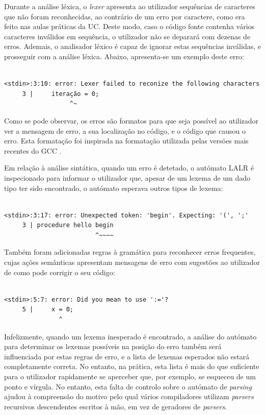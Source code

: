 \documentclass[12pt, a4paper]{article}
\begin{document}
Durante a análise léxica, o \emph{lexer} apresenta ao utilizador sequências de caracteres que não
foram reconhecidas, ao contrário de um erro por caractere, como era feito nas aulas práticas da UC.
Deste modo, caso o código fonte contenha vários caracteres inválidos em sequência, o utilizador não
se deparará com dezenas de erros. Ademais, o analisador léxico é capaz de ignorar estas sequências
inválidas, e prosseguir com a análise léxica. Abaixo, apresenta-se um exemplo deste erro:


\begin{lstlisting}

<stdin>:3:10: error: Lexer failed to reconize the following characters
     3 |     iteração = 0;
                  ^~
\end{lstlisting}

Como se pode observar, os erros são formatos para que seja possível ao utilizador ver a mensagem de
erro, a sua localização no código, e o código que causou o erro. Esta formatação foi inspirada na
formatação utilizada pelas versões mais recentes do GCC \cite{gcc-errors}.

Em relação à análise sintática, quando um erro é detetado, o autómato LALR é inspecionado para
informar o utilizador que, apesar de um lexema de um dado tipo ter sido encontrado, o autómato
esperava outros tipos de lexema:

\begin{lstlisting}

<stdin>:3:17: error: Unexpected token: 'begin'. Expecting: '(', ';'
     3 | procedure hello begin
                         ^~~~~
\end{lstlisting}

Também foram adicionadas regras à gramática para reconhecer erros frequentes, cujas ações semânticas
apresentam mensagens de erro com sugestões ao utilizador de como pode corrigir o seu código:

\begin{lstlisting}

<stdin>:5:7: error: Did you mean to use ':='?
     5 |     x = 0;
               ^
\end{lstlisting}

Infelizmente, quando um lexema inesperado é encontrado, a análise do autómato para determinar os
lexemas possíveis na posição do erro também será influenciada por estas regras de erro, e a lista
de lexemas esperados não estará completamente correta. No entanto, na prática, esta lista é mais
do que suficiente para o utilizador rapidamente se aperceber que, por exemplo, se esqueceu de um
ponto e vírgula. No entanto, esta falta de controlo sobre o autómato de \emph{parsing} ajudou à
compreensão do motivo pelo qual vários compiladores utilizam \emph{parsers} recursivos descendentes
escritos à mão, em vez de geradores de \emph{parsers}. \cite{compilers-handwritten-parser}
\end{document}
